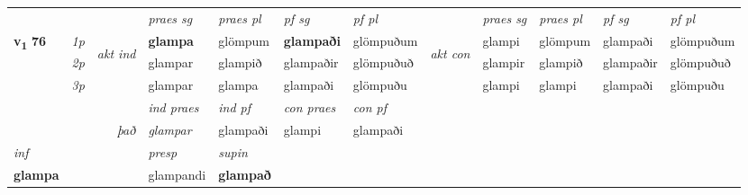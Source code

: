 \begin{longtable}[l]{X>{\footnotesize\itshape}llXXXXlXXXX}
 & &   & \textit{praes sg}  & \textit{praes pl}    & \textit{ pf sg} & \textit{pf pl} & & \textit{praes sg}  & \textit{praes pl}    & \textit{pf sg} & \textit{pf pl }  \\ \cmidrule{4-7} \cmidrule{9-12}
 \multirow{2}{*}{{{\textbf{v{\textsubscript{1}}} \Large{\textbf{76}}}}}  & 1p & \multirow{3}{*}{\begin{turn}{90}\textit{akt ind}\end{turn}} & \textbf{glampa} & glömpum & \textbf{glampaði} & glömpuðum & \multirow{3}{*}{\begin{turn}{90}\textit{akt con}\end{turn}} &glampi & glömpum & glampaði & glömpuðum\\*
 & 2p &  &  glampar  & glampið & glampaðir & glömpuðuð & & glampir & glampið & glampaðir & glömpuðuð \\*
 & 3p &  & glampar & glampa & glampaði & glömpuðu & & glampi & glampi& glampaði & glömpuðu \\*
\cmidrule{4-7} \cmidrule{9-12}

   && &  \textit{ind praes} & \textit{ind pf} & \textit{con praes} & \textit{con pf} \\*
\multicolumn{3}{r}{\textit{það}} & glampar & glampaði & glampi & glampaði \\*

\cmidrule{4-7}
   {\textit{inf}} & &     & \textit{presp} & \textit{supin}   \\*
  {\textbf{glampa}} & &     & glampandi &  \textbf{glampað}   \\*

\midrule


\end{longtable}
